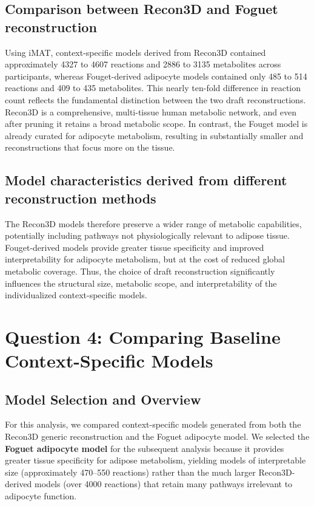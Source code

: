 \documentclass[11pt, a4paper]{article}
\begin{document}
\subsection{Comparison between Recon3D and Foguet reconstruction}
Using iMAT, context-specific models derived from Recon3D contained approximately 4327 to 4607 reactions and 2886 to 3135 metabolites across participants, whereas Fouget-derived adipocyte models contained only 485 to 514 reactions and 409 to 435 metabolites. This nearly ten-fold difference in reaction count reflects the fundamental distinction between the two draft reconstructions. Recon3D is a comprehensive, multi-tissue human metabolic network, and even after pruning it retains a broad metabolic scope. In contrast, the Fouget model is already curated for adipocyte metabolism, resulting in substantially smaller and reconstructions that focus more on the tissue.

\subsection{Model characteristics derived from different reconstruction methods}
The Recon3D models therefore preserve a wider range of metabolic capabilities, potentially including pathways not physiologically relevant to adipose tissue. Fouget-derived models provide greater tissue specificity and improved interpretability for adipocyte metabolism, but at the cost of reduced global metabolic coverage. Thus, the choice of draft reconstruction significantly influences the structural size, metabolic scope, and interpretability of the individualized context-specific models.


\section{Question 4: Comparing Baseline Context-Specific Models}
\label{sec:q4}

\subsection{Model Selection and Overview}

For this analysis, we compared context-specific models generated from both the Recon3D generic reconstruction and the Foguet adipocyte model. We selected the \textbf{Foguet adipocyte model} for the subsequent analysis because it provides greater tissue specificity for adipose metabolism, yielding models of interpretable size (approximately 470--550 reactions) rather than the much larger Recon3D-derived models (over 4000 reactions) that retain many pathways irrelevant to adipocyte function.
\end{document}
